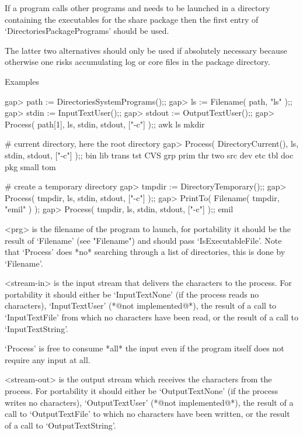 If a program calls other programs and needs to be launched in a directory
containing the executables for the share package then  the first entry of
`DirectoriesPackagePrograms' should be used.

The latter  two alternatives should only  be used if absolutely necessary
because otherwise one risks accumulating log or core files in the package
directory.

Examples

\beginexample
   gap> path := DirectoriesSystemPrograms();;
   gap> ls := Filename( path, "ls" );;
   gap> stdin := InputTextUser();;
   gap> stdout := OutputTextUser();;
   gap> Process( path[1], ls, stdin, stdout, ["-c"] );;
   awk    ls     mkdir

   # current directory, here the root directory
   gap> Process( DirectoryCurrent(), ls, stdin, stdout, ["-c"] );;
   bin    lib    trans  tst    CVS    grp    prim   thr    two
   src    dev    etc    tbl    doc    pkg    small  tom

   # create a temporary directory
   gap> tmpdir := DirectoryTemporary();;                          
   gap> Process( tmpdir, ls, stdin, stdout, ["-c"] );;            
   gap> PrintTo( Filename( tmpdir, "emil" ) );
   gap> Process( tmpdir, ls, stdin, stdout, ["-c"] );;
   emil
\endexample

<prg> is the filename of the program to launch, for portability it should
be   the  result  of   `Filename'   (see   "Filename") and   should  pass
`IsExecutableFile'.  Note that  `Process'  does *no* searching through  a
list of directories, this is done by `Filename'.

<stream-in>  is the  input stream   that  delivers the characters  to the
process.   For portability it  should either  be `InputTextNone' (if  the
process reads  no characters), `InputTextUser' (*@not implemented@*), the
result  of a call to `InputTextFile'  from which  no characters have been
read, or the result of a call to `InputTextString'.

`Process' is  free to consume *all* the  input even if the program itself
does not require any input at all.

<stream-out> is the output stream  which receives the characters from the
process.  For portability it should   either be `OutputTextNone' (if  the
process writes  no  characters), `OutputTextUser' (*@not  implemented@*),
the result of a call to `OutputTextFile' to which no characters have been
written, or the result of a call to `OutputTextString'.


